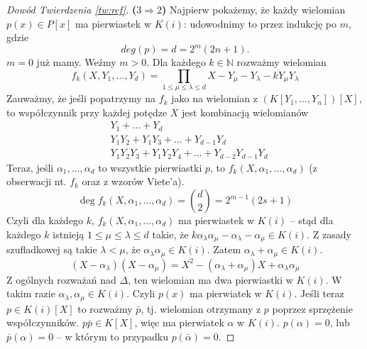 \documentclass{article}
\newcommand{\N}{\mathbb{N}}
\theoremstyle{plain}
\theoremstyle{definition}
\theoremstyle{remark}
\begin{document}
\begin{proof}[Dowód Twierdzenia \ref{tw:rcf}]
	\textbf{($3 \Rightarrow 2$)}
	Najpierw pokażemy, że każdy wielomian $p(x) \in P[x]$ ma pierwiastek w
	$K(i)$: udowodnimy to przez indukcję po $m$, gdzie
	$$deg(p) = d = 2^m(2n + 1).$$
	$m = 0$ już mamy. Weźmy $m > 0$.
	Dla każdego $k \in \N$ rozważmy wielomian
	\[
		f_k(X, Y_1, \ldots, Y_d) =
		\prod_{1 \leq \mu \leq \lambda \leq d}
		X - Y_\mu - Y_\lambda - k Y_\mu Y_\lambda
	\]
	Zauważmy, że jeśli popatrzymy na $f_k$ jako na wielomian z
	$(K[Y_1, \ldots, Y_n])[X]$, to współczynnik przy każdej potędze $X$
	jest kombinacją wielomianów
	\begin{align*}
		&Y_1 + \ldots + Y_d \\
		&Y_1 Y_2 + Y_1 Y_3 + \ldots + Y_{d-1} Y_d \\
		&Y_1 Y_2 Y_3 + Y_1 Y_2 Y_4 + \ldots + Y_{d-2} Y_{d-1} Y_d
	\end{align*}
	Teraz, jeśli $\alpha_1, \ldots, \alpha_d$ to wszystkie pierwiastki
	$p$, to $f_k(X, \alpha_1, \ldots, \alpha_d)$ %
	(z obserwacji nt. $f_k$ oraz z wzorów Viete'a).
	\[
		\deg f_k(X, \alpha_1, \ldots, \alpha_d) = {d \choose 2} =
		2^{m-1}(2s + 1)
	\]
	Czyli dla każdego $k$, $f_k(X, \alpha_1, \ldots, \alpha_d)$ ma
	pierwiastek w $K(i)$ -- stąd dla każdego $k$ istnieją
	$1 \leq \mu \leq \lambda \leq d$ takie, że
	$k \alpha_\lambda \alpha_\mu - \alpha_\lambda - \alpha_\mu \in K(i)$.
	Z zasady szufladkowej są takie $\lambda < \mu$, że
	$\alpha_\lambda \alpha_\mu \in K(i)$. Zatem
	$\alpha_\lambda + \alpha_\mu \in K(i)$.
	\begin{equation}
		(X - \alpha_\lambda) (X - \alpha_\mu) =
		X^2 - (\alpha_\lambda + \alpha_\mu) X + \alpha_\lambda \alpha_\mu
	\end{equation}
	Z ogólnych rozważań nad $\Delta$, ten wielomian ma dwa pierwiastki
	w $K(i)$. W takim razie $\alpha_\lambda, \alpha_\mu \in K(i)$.
	Czyli $p(x)$ ma pierwiatek w $K(i)$. Jeśli teraz $p \in K(i)[X]$ to
	rozważmy $\bar{p}$, tj. wielomian otrzymany z $p$ poprzez sprzężenie
	współczynników. $p \bar{p} \in K[X]$, więc ma pierwiatek $\alpha$
	w $K(i)$. $p(\alpha) = 0$, lub $\bar{p}(\alpha) = 0$ -- w którym to
	przypadku $p(\bar{\alpha}) = 0$.
\end{proof}
\end{document}
